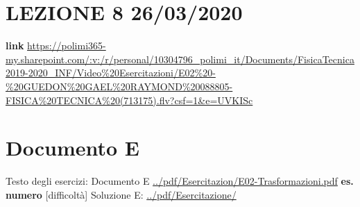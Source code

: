 \section*{LEZIONE 8 26/03/2020}
\textbf{link} \url{https://polimi365-my.sharepoint.com/:v:/r/personal/10304796_polimi_it/Documents/FisicaTecnica2019-2020_INF/Video%20Esercitazioni/E02%20-%20GUEDON%20GAEL%20RAYMOND%20088805-FISICA%20TECNICA%20(713175).flv?csf=1&e=UVKISc}
\section*{Documento E}
Testo degli esercizi:\newline
Documento E \url{../pdf/Esercitazion/E02-Trasformazioni.pdf}\newline
\newline
\textbf{es. numero} [difficoltà]\newline
Soluzione E: \url{../pdf/Esercitazione/}